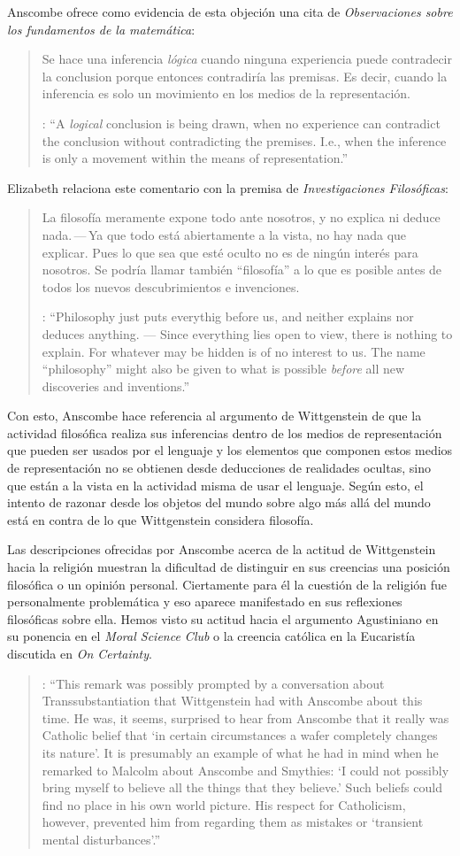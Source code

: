 Anscombe ofrece como evidencia de esta objeción una cita de \emph{Observaciones sobre los fundamentos de la matemática}: \blockquote[{\cite[VII, 25]{wittgenstein1956remmath}}: \enquote{A \emph{logical} conclusion is being drawn, when no experience can contradict the conclusion without contradicting the premises. I.e., when the inference is only a movement within the means of representation.}]{Se hace una inferencia \emph{lógica} cuando ninguna experiencia puede contradecir la conclusion porque entonces contradiría las premisas. Es decir, cuando la inferencia es solo un movimiento en los medios de la representación.} Elizabeth relaciona este comentario con la premisa de \emph{Investigaciones Filosóficas}: \blockquote[{\cite[\S126]{wittgenstein1953phiinv}}: \enquote{Philosophy just puts everythig before us, and neither explains nor deduces anything. --- Since everything lies open to view, there is nothing to explain. For whatever may be hidden is of no interest to us. The name ``philosophy'' might also be given to what is possible \emph{before} all new discoveries and inventions.}]{La filosofía meramente expone todo ante nosotros, y no explica ni deduce nada.\,---\,Ya que todo está abiertamente a la vista, no hay nada que explicar. Pues lo que sea que esté oculto no es de ningún interés para nosotros. Se podría llamar también ``filosofía'' a lo que es posible antes de todos los nuevos descubrimientos e invenciones.} Con esto, Anscombe hace referencia al argumento de Wittgenstein de que la actividad filosófica realiza sus inferencias dentro de los medios de representación que pueden ser usados por el lenguaje y los elementos que componen estos medios de representación no se obtienen desde deducciones de realidades ocultas, sino que están a la vista en la actividad misma de usar el lenguaje. Según esto, el intento de razonar desde los objetos del mundo sobre algo más allá del mundo está en contra de lo que Wittgenstein considera filosofía.

Las descripciones ofrecidas por Anscombe acerca de la actitud de Wittgenstein hacia la religión muestran la dificultad de distinguir en sus creencias una posición filosófica o un opinión personal. Ciertamente para él la cuestión de la religión fue personalmente problemática y eso aparece manifestado en sus reflexiones filosóficas sobre ella. Hemos visto su actitud hacia el argumento Agustiniano en su ponencia en el \emph{Moral Science Club} o la creencia católica en la Eucaristía discutida en \emph{On Certainty}.

\blockquote[{\cite[572]{monk1991duty}}: \enquote{This remark was possibly prompted by a conversation about Transsubstantiation that Wittgenstein had with Anscombe about this time. He was, it seems, surprised to hear from Anscombe that it really was Catholic belief that ‘in certain circumstances a wafer completely changes its nature’. It is presumably an example of what he had in mind when he remarked to Malcolm about Anscombe and Smythies: ‘I could not possibly bring myself to believe all the things that they believe.’ Such beliefs could find no place in his own world picture. His respect for Catholicism, however, prevented him from regarding them as mistakes or ‘transient mental disturbances’.}]{}

